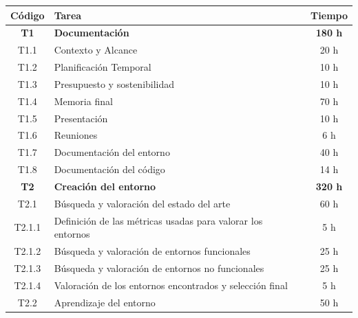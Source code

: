 \begin{table}[]
	\begin{center}
		\begin{tabular}{| c | l | c |}
			\hline
			\textbf{Código} & \textbf{Tarea}                                                 & \textbf{Tiempo} \\ \hline
			\textbf{T1}     & \textbf{Documentación}                                         & \textbf{180 h}  \\ \hline
			T1.1            & Contexto y Alcance                                             & 20 h            \\
			T1.2            & Planificación Temporal                                         & 10 h            \\
			T1.3            & Presupuesto y sostenibilidad                                   & 10 h            \\
			T1.4            & Memoria final                                                  & 70 h            \\
			T1.5            & Presentación                                                   & 10 h            \\
			T1.6            & Reuniones                                                      & 6 h             \\
			T1.7            & Documentación del entorno                                      & 40 h            \\
			T1.8            & Documentación del código                                       & 14 h            \\
			\hline
			\textbf{T2}     & \textbf{Creación del entorno}                                  & \textbf{320 h}  \\ \hline
			T2.1            & Búsqueda y valoración del estado del arte                      & 60 h            \\ \hline
			T2.1.1          & Definición de las métricas usadas para valorar los entornos    & 5 h             \\
			T2.1.2          & Búsqueda y valoración de entornos funcionales                  & 25 h            \\
			T2.1.3          & Búsqueda y valoración de entornos no funcionales               & 25 h            \\
			T2.1.4          & Valoración de los entornos encontrados y selección final       & 5 h             \\ \hline
			T2.2            & Aprendizaje del entorno                                        & 50 h            \\ \hline

\end{tabular}
\end{center}
\end{table}
